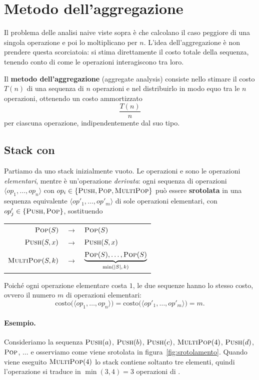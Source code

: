 \section{Metodo dell'aggregazione}\label{sec:aggregazione}
Il problema delle analisi naive viste sopra è che calcolano il caso peggiore di una singola operazione e poi lo moltiplicano per $n$. L'idea dell'aggregazione è non prendere questa scorciatoia: si stima direttamente il costo totale della sequenza, tenendo conto di come le operazioni interagiscono tra loro.

\begin{definizione}\label{def:aggregazione}
Il \textbf{metodo dell'aggregazione} (aggregate analysis) consiste nello stimare il costo $T(n)$ di una sequenza di $n$ operazioni e nel distribuirlo in modo equo tra le $n$ operazioni, ottenendo un costo ammortizzato
\[
\frac{T(n)}{n}
\]
per ciascuna operazione, indipendentemente dal suo tipo.
\end{definizione}

\subsection{Stack con \MultiPop}
Partiamo da uno stack inizialmente vuoto. Le operazioni \Push{} e \Pop{} sono le operazioni \emph{elementari}, mentre \MultiPop{} è un'operazione \emph{derivata}: ogni sequenza di operazioni $\langle op_1,\dots,op_n\rangle$ con $op_i \in \{\textsc{Push},\textsc{Pop},\textsc{MultiPop}\}$ può essere \textbf{srotolata} in una sequenza equivalente $\langle op'_1,\dots,op'_m\rangle$ di sole operazioni elementari, con $op'_j \in \{\textsc{Push},\textsc{Pop}\}$, sostituendo
\begin{center}
\begin{tabular}{rcl}
$\textsc{Pop}(S)$ & $\longrightarrow$ & $\textsc{Pop}(S)$ \\
$\textsc{Push}(S,x)$ & $\longrightarrow$ & $\textsc{Push}(S,x)$ \\
$\textsc{MultiPop}(S,k)$ & $\longrightarrow$ & $\underbrace{\textsc{Pop}(S),\dots,\textsc{Pop}(S)}_{\min(|S|,\,k)}$
\end{tabular}
\end{center}
Poiché ogni operazione elementare costa $1$, le due sequenze hanno lo stesso costo, ovvero il numero $m$ di operazioni elementari:
\[
\text{costo}\big(\langle op_1,\dots,op_n\rangle\big) = \text{costo}\big(\langle op'_1,\dots,op'_m\rangle\big) = m.
\]

\paragraph{Esempio.}
Consideriamo la sequenza $\textsc{Push}(a)$, $\textsc{Push}(b)$, $\textsc{Push}(c)$, $\textsc{MultiPop}(4)$, $\textsc{Push}(d)$, $\textsc{Pop}$, $\dots$ e osserviamo come viene srotolata in figura~\ref{fig:srotolamento}. Quando viene eseguito $\textsc{MultiPop}(4)$ lo stack contiene soltanto tre elementi, quindi l'operazione si traduce in $\min(3,4)=3$ operazioni di \Pop.

